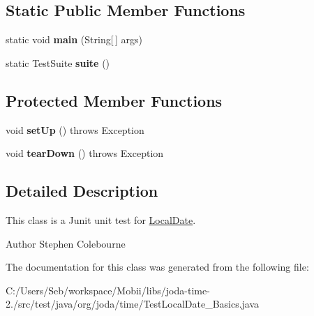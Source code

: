 \subsection*{Static Public Member Functions}
\begin{DoxyCompactItemize}
\item 
\hypertarget{classorg_1_1joda_1_1time_1_1_test_local_date___basics_ae6550e7e4604e435a05530c7002b23b0}{static void {\bfseries main} (String\mbox{[}$\,$\mbox{]} args)}\label{classorg_1_1joda_1_1time_1_1_test_local_date___basics_ae6550e7e4604e435a05530c7002b23b0}

\item 
\hypertarget{classorg_1_1joda_1_1time_1_1_test_local_date___basics_a48abbe15f3ff52558e12fbba2203a198}{static Test\-Suite {\bfseries suite} ()}\label{classorg_1_1joda_1_1time_1_1_test_local_date___basics_a48abbe15f3ff52558e12fbba2203a198}

\end{DoxyCompactItemize}
\subsection*{Protected Member Functions}
\begin{DoxyCompactItemize}
\item 
\hypertarget{classorg_1_1joda_1_1time_1_1_test_local_date___basics_a2dfdf9e8c9dd86b321fd54d3784fccb8}{void {\bfseries set\-Up} ()  throws Exception }\label{classorg_1_1joda_1_1time_1_1_test_local_date___basics_a2dfdf9e8c9dd86b321fd54d3784fccb8}

\item 
\hypertarget{classorg_1_1joda_1_1time_1_1_test_local_date___basics_a07d96b6f9bea751a3f1bf78dd167ff93}{void {\bfseries tear\-Down} ()  throws Exception }\label{classorg_1_1joda_1_1time_1_1_test_local_date___basics_a07d96b6f9bea751a3f1bf78dd167ff93}

\end{DoxyCompactItemize}


\subsection{Detailed Description}
This class is a Junit unit test for \hyperlink{classorg_1_1joda_1_1time_1_1_local_date}{Local\-Date}.

\begin{DoxyAuthor}{Author}
Stephen Colebourne 
\end{DoxyAuthor}


The documentation for this class was generated from the following file\-:\begin{DoxyCompactItemize}
\item 
C\-:/\-Users/\-Seb/workspace/\-Mobii/libs/joda-\/time-\/2./src/test/java/org/joda/time/Test\-Local\-Date\-\_\-\-Basics.\-java\end{DoxyCompactItemize}
